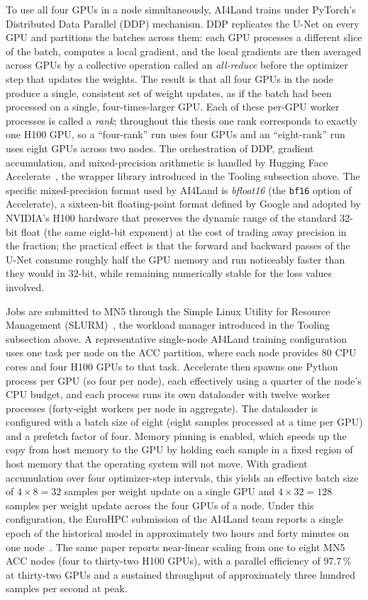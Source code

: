 \documentclass[12pt,a4paper]{article}
\begin{document}
To use all four GPUs in a node simultaneously, AI4Land trains under PyTorch's Distributed
Data Parallel (DDP) mechanism. DDP replicates the U-Net on every GPU and partitions the
batches across them: each GPU processes a different slice of the batch, computes a local
gradient, and the local gradients are then averaged across GPUs by a collective operation
called an \emph{all-reduce} before the optimizer step that updates the weights. The result is
that all four GPUs in the node produce a single, consistent set of weight updates, as if the
batch had been processed on a single, four-times-larger GPU. Each of these per-GPU worker
processes is called a \emph{rank}; throughout this thesis one rank corresponds to exactly one
H100 GPU, so a ``four-rank'' run uses four GPUs and an ``eight-rank'' run uses eight GPUs
across two nodes. The orchestration of DDP,
gradient accumulation, and mixed-precision arithmetic is handled by Hugging Face
Accelerate~\cite{accelerate}, the wrapper library introduced in the Tooling subsection above.
The specific mixed-precision format used by AI4Land is \emph{bfloat16} (the \texttt{bf16}
option of Accelerate), a sixteen-bit floating-point format defined by Google and adopted by
NVIDIA's H100 hardware that preserves the dynamic range of the standard 32-bit float (the
same eight-bit exponent) at the cost of trading away precision in the fraction; the practical
effect is that the forward and backward passes of the U-Net consume roughly half the GPU
memory and run noticeably faster than they would in 32-bit, while remaining numerically
stable for the loss values involved.

Jobs are submitted to MN5 through the Simple Linux Utility for Resource Management
(SLURM)~\cite{slurm}, the workload manager introduced in the Tooling subsection above. A
representative single-node AI4Land training configuration uses one task per node on the ACC
partition, where each node provides 80 CPU cores and four H100 GPUs to that task. Accelerate
then spawns one Python process per GPU (so four per node), each effectively using a quarter
of the node's CPU budget, and each process runs its own dataloader with twelve worker
processes (forty-eight workers per node in aggregate). The dataloader is
configured with a batch size of eight (eight samples processed at a time per GPU) and a
prefetch factor of four. Memory pinning is enabled, which speeds up the copy from host memory
to the GPU by holding each sample in a fixed region of host memory that the operating system
will not move. With gradient accumulation over four optimizer-step intervals, this yields an
effective batch size of $4 \times 8 = 32$ samples per weight update on a single GPU and
$4 \times 32 = 128$ samples per weight update across the four GPUs of a node. Under this
configuration, the EuroHPC submission of the AI4Land team reports a single epoch of the
historical model in approximately two hours and forty minutes on one
node~\cite{mozaffari2026ai4land}. The same paper reports near-linear scaling from one to
eight MN5 ACC nodes (four to thirty-two H100 GPUs), with a parallel efficiency of
$97.7\,\%$ at thirty-two GPUs and a sustained throughput of approximately three hundred
samples per second at peak.
\end{document}
